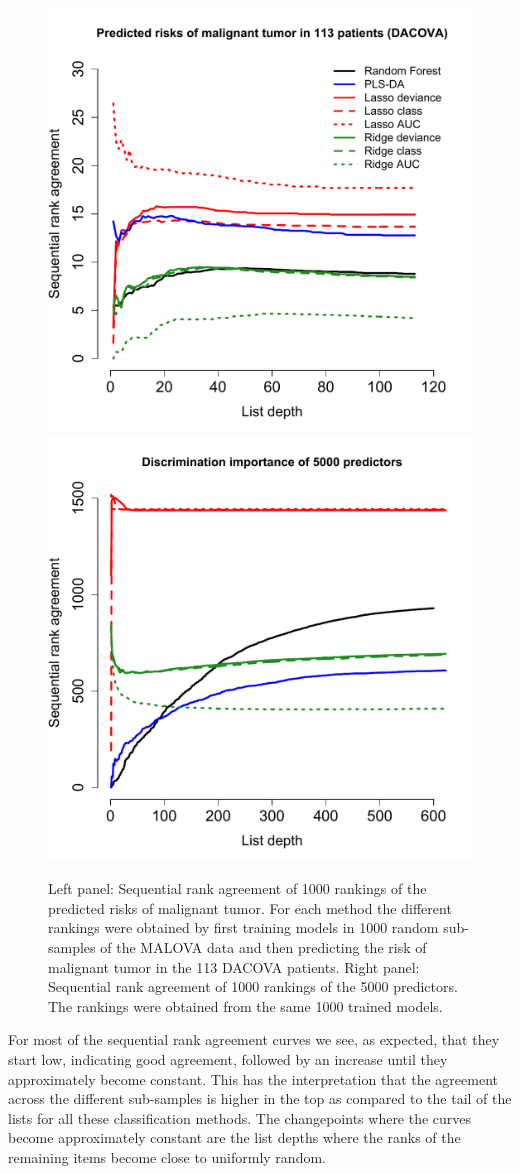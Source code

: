\documentclass[12pt,a4paper]{article}
\theoremstyle{plain}
\begin{document}
\begin{figure}[htbp]
\begin{center}
\includegraphics[width=.49\textwidth]{pics/riskAgreementPlot}%
\includegraphics[width=.49\textwidth]{pics/predictorAgreementPlot}
\end{center}
\caption{Left panel: Sequential rank agreement of 1000 rankings of the
  predicted risks of malignant tumor. For each method the different
  rankings were obtained by first training models in 1000 random
  sub-samples of the MALOVA data and then predicting the risk of
  malignant tumor in the 113 DACOVA patients. Right panel: Sequential
  rank agreement of 1000 rankings of the 5000 predictors. The rankings
  were obtained from the same 1000 trained models.}
 \label{fig:app1}
\end{figure}

For most of the sequential rank agreement curves we see, as expected,
that they start low, indicating good agreement, followed by an
increase until they approximately become constant. This has the
interpretation that the agreement across the different sub-samples is
higher in the top as compared to the tail of the lists for all these
classification methods. The changepoints where the curves become
approximately constant are the list depths where the ranks of the
remaining items become close to uniformly random.
\end{document}
